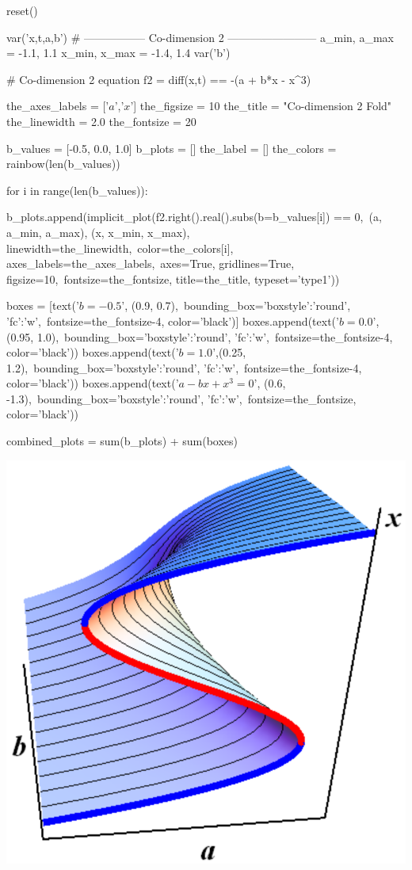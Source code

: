 \begin{sagesilent}
	reset()

	var('x,t,a,b')
	# ----------------- Co-dimension 2 ------------------------
	a_min, a_max = -1.1, 1.1
	x_min, x_max = -1.4, 1.4
	var('b')

	# Co-dimension 2 equation
	f2 = diff(x,t) == -(a + b*x - x^3)

	the_axes_labels = ['$a$','$x$']
	the_figsize = 10
	the_title = "Co-dimension 2 Fold"
	the_linewidth = 2.0
	the_fontsize = 20

	b_values = [-0.5, 0.0, 1.0]
	b_plots = []
	the_label = []
	the_colors = rainbow(len(b_values))

	for i in range(len(b_values)):

	    b_plots.append(implicit_plot(f2.right().real().subs(b=b_values[i]) == 0,\
	    		(a, a_min, a_max), (x, x_min, x_max), linewidth=the_linewidth,\
	    		color=the_colors[i], axes_labels=the_axes_labels,\
	    		axes=True, gridlines=True, figsize=10,\
	    		fontsize=the_fontsize, title=the_title, typeset='type1'))

	boxes = [text('$b = -0.5$', (0.9, 0.7),\
			bounding_box={'boxstyle':'round', 'fc':'w'},\
			fontsize=the_fontsize-4, color='black')]
	boxes.append(text('$b = 0.0$', (0.95, 1.0),\
			bounding_box={'boxstyle':'round', 'fc':'w'},\
			fontsize=the_fontsize-4, color='black'))
	boxes.append(text('$b = 1.0$',(0.25, 1.2),\
			bounding_box={'boxstyle':'round', 'fc':'w'},\
			fontsize=the_fontsize-4, color='black'))
	boxes.append(text('$a - bx + x^3 = 0$', (0.6, -1.3),\
			bounding_box={'boxstyle':'round', 'fc':'w'},\
			fontsize=the_fontsize, color='black'))

	combined_plots = sum(b_plots) + sum(boxes)
\end{sagesilent}
	{\includegraphics[width=\textwidth]{../Graphics/Bif_Graphs/Bif_3D.png}}
